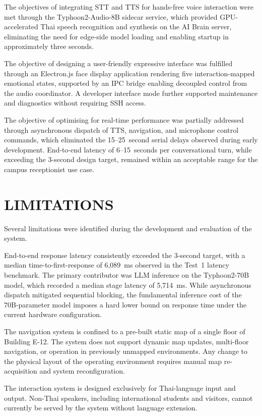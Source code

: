 The objectives of integrating STT and TTS for hands-free voice interaction were met through the Typhoon2-Audio-8B sidecar service, which provided GPU-accelerated Thai speech recognition and synthesis on the AI Brain server, eliminating the need for edge-side model loading and enabling startup in approximately three seconds.

The objective of designing a user-friendly expressive interface was fulfilled through an Electron.js face display application rendering five interaction-mapped emotional states, supported by an IPC bridge enabling decoupled control from the audio coordinator. A developer interface mode further supported maintenance and diagnostics without requiring SSH access.

The objective of optimising for real-time performance was partially addressed through asynchronous dispatch of TTS, navigation, and microphone control commands, which eliminated the 15--25~second serial delays observed during early development. End-to-end latency of 6--15~seconds per conversational turn, while exceeding the 3-second design target, remained within an acceptable range for the campus receptionist use case.

\section{LIMITATIONS}

Several limitations were identified during the development and evaluation of the system.

End-to-end response latency consistently exceeded the 3-second target, with a median time-to-first-response of 6,089~ms observed in the Test~1 latency benchmark. The primary contributor was LLM inference on the Typhoon2-70B model, which recorded a median stage latency of 5,714~ms. While asynchronous dispatch mitigated sequential blocking, the fundamental inference cost of the 70B-parameter model imposes a hard lower bound on response time under the current hardware configuration.

The navigation system is confined to a pre-built static map of a single floor of Building E-12. The system does not support dynamic map updates, multi-floor navigation, or operation in previously unmapped environments. Any change to the physical layout of the operating environment requires manual map re-acquisition and system reconfiguration.

The interaction system is designed exclusively for Thai-language input and output. Non-Thai speakers, including international students and visitors, cannot currently be served by the system without language extension.

